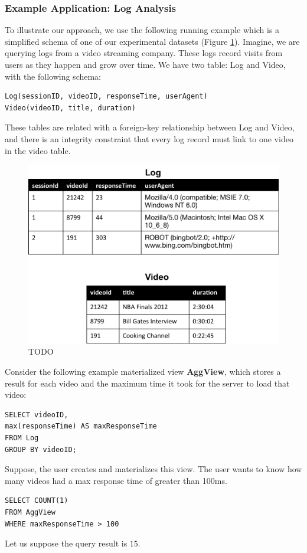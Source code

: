 \subsubsection{Example Application: Log Analysis}
To illustrate our approach, we use the following running example which is a 
simplified schema of one of our experimental datasets (Figure \ref{example}).
Imagine, we are querying logs from a video streaming company. 
These logs record visits from users as they happen and grow over time.
We have two table: Log and Video, with the following schema:
\begin{lstlisting}
Log(sessionID, videoID, responseTime, userAgent)
Video(videoID, title, duration)
\end{lstlisting}
These tables are related with a foreign-key relationship between
Log and Video, and there is an integrity constraint that every log
record must link to one video in the video table.

\begin{figure}[h]
\label{example}
\centering
 \includegraphics[width=\columnwidth]{figs/sample-clean-example.png}
 \caption{TODO}
\end{figure}

Consider the following example materialized view \textbf{AggView}, which stores a result for each video and the maximum time it took for the server to load that video:
\begin{lstlisting} 
SELECT videoID, 
max(responseTime) AS maxResponseTime 
FROM Log 
GROUP BY videoID;
\end{lstlisting}

Suppose, the user creates and materializes this view.
The user wants to know how many videos had a max response time of greater than 100ms.
\begin{lstlisting} 
SELECT COUNT(1)
FROM AggView
WHERE maxResponseTime > 100
\end{lstlisting}
Let us suppose the query result is $15$.

